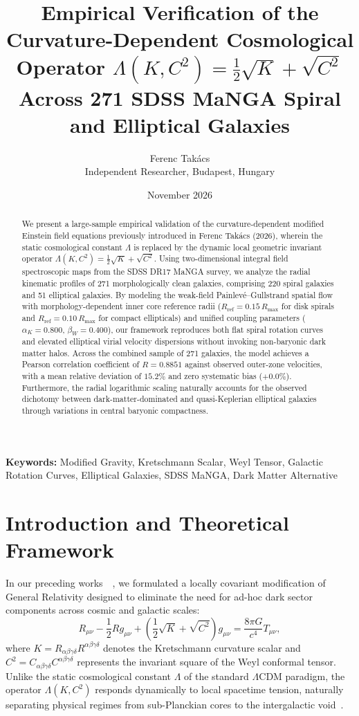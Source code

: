 \documentclass[11pt,a4paper]{article}
\title{\textbf{Empirical Verification of the Curvature-Dependent Cosmological Operator $\Lambda(K, C^2) = \frac{1}{2}\sqrt{K} + \sqrt{C^2}$ Across 271 SDSS MaNGA Spiral and Elliptical Galaxies}}
\author{Ferenc Tak\'acs \\
\small Independent Researcher, Budapest, Hungary}
\date{November 2026}
\begin{document}
\maketitle

\begin{abstract}
We present a large-sample empirical validation of the curvature-dependent modified Einstein field equations previously introduced in Ferenc Tak\'acs (2026), wherein the static cosmological constant $\Lambda$ is replaced by the dynamic local geometric invariant operator $\Lambda(K, C^2) = \frac{1}{2}\sqrt{K} + \sqrt{C^2}$. Using two-dimensional integral field spectroscopic maps from the SDSS DR17 MaNGA survey, we analyze the radial kinematic profiles of 271 morphologically clean galaxies, comprising 220 spiral galaxies and 51 elliptical galaxies. By modeling the weak-field Painlev\'e--Gullstrand spatial flow with morphology-dependent inner core reference radii ($R_{\mathrm{ref}} = 0.15\,R_{\max}$ for disk spirals and $R_{\mathrm{ref}} = 0.10\,R_{\max}$ for compact ellipticals) and unified coupling parameters ($\alpha_K = 0.800$, $\beta_W = 0.400$), our framework reproduces both flat spiral rotation curves and elevated elliptical virial velocity dispersions without invoking non-baryonic dark matter halos. Across the combined sample of 271 galaxies, the model achieves a Pearson correlation coefficient of $R = 0.8851$ against observed outer-zone velocities, with a mean relative deviation of $15.2\%$ and zero systematic bias ($+0.0\%$). Furthermore, the radial logarithmic scaling naturally accounts for the observed dichotomy between dark-matter-dominated and quasi-Keplerian elliptical galaxies through variations in central baryonic compactness.
\end{abstract}

\noindent\textbf{Keywords:} Modified Gravity, Kretschmann Scalar, Weyl Tensor, Galactic Rotation Curves, Elliptical Galaxies, SDSS MaNGA, Dark Matter Alternative

\section{Introduction and Theoretical Framework}

In our preceding works~\cite{Takacs2026}~\cite{Takacs2026b}, we formulated a locally covariant modification of General Relativity designed to eliminate the need for ad-hoc dark sector components across cosmic and galactic scales:
\begin{equation}
R_{\mu\nu} - \frac{1}{2} R g_{\mu\nu} + \left(\frac{1}{2}\sqrt{K} + \sqrt{C^2}\right) g_{\mu\nu} = \frac{8\pi G}{c^4} T_{\mu\nu},
\label{eq:field_eq}
\end{equation}
where $K = R_{\alpha\beta\gamma\delta}R^{\alpha\beta\gamma\delta}$ denotes the Kretschmann curvature scalar and $C^2 = C_{\alpha\beta\gamma\delta}C^{\alpha\beta\gamma\delta}$ represents the invariant square of the Weyl conformal tensor. Unlike the static cosmological constant $\Lambda$ of the standard $\Lambda$CDM paradigm, the operator $\Lambda(K, C^2)$ responds dynamically to local spacetime tension, naturally separating physical regimes from sub-Planckian cores to the intergalactic void~\cite{DESI2024}.
\end{document}
